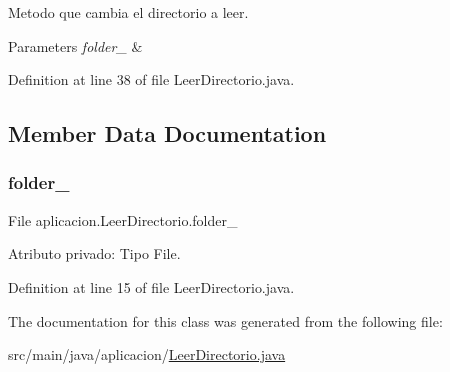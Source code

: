 Metodo que cambia el directorio a leer. 
\begin{DoxyParams}{Parameters}
{\em folder\+\_\+} & \\
\hline
\end{DoxyParams}


Definition at line 38 of file Leer\+Directorio.\+java.



\subsection{Member Data Documentation}
\hypertarget{classaplicacion_1_1_leer_directorio_a031199bdbe2aad57413386f22a4bc81d}{}\label{classaplicacion_1_1_leer_directorio_a031199bdbe2aad57413386f22a4bc81d} 
\subsubsection{\texorpdfstring{folder\+\_\+}{folder\_}}
{\footnotesize\ttfamily File aplicacion.\+Leer\+Directorio.\+folder\+\_\+\hspace{0.3cm}{\ttfamily [private]}}

Atributo privado\+: Tipo File. 

Definition at line 15 of file Leer\+Directorio.\+java.



The documentation for this class was generated from the following file\+:\begin{DoxyCompactItemize}
\item 
src/main/java/aplicacion/\hyperlink{_leer_directorio_8java}{Leer\+Directorio.\+java}\end{DoxyCompactItemize}
